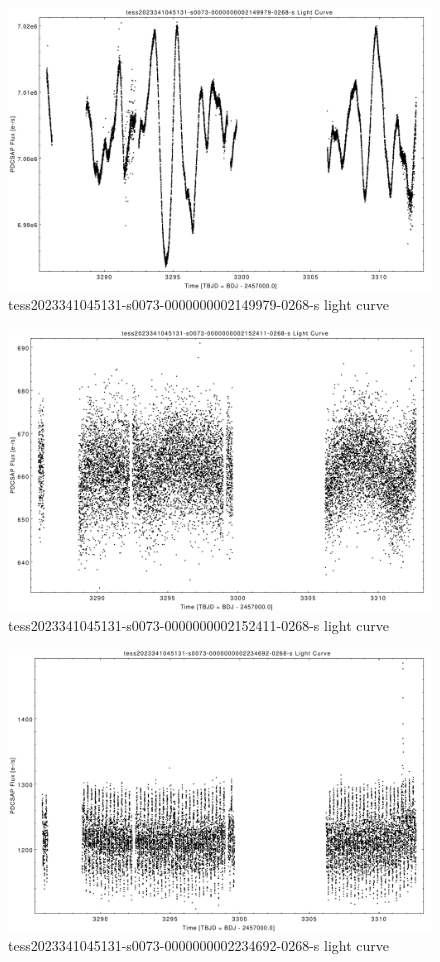 \documentclass[a4paper,12pt]{article}
\begin{document}
\begin{figure}[htbp]
    \centering
    \includegraphics[width = 1\textwidth]{
      ../lightcurves/tess2023341045131-s0073-0000000002149979-0268-s.pdf}
    \caption{tess2023341045131-s0073-0000000002149979-0268-s light curve}
\end{figure}
\begin{figure}[htbp]
    \centering
    \includegraphics[width = 1\textwidth]{
      ../lightcurves/tess2023341045131-s0073-0000000002152411-0268-s.pdf}
    \caption{tess2023341045131-s0073-0000000002152411-0268-s light curve}
\end{figure}
\begin{figure}[htbp]
    \centering
    \includegraphics[width = 1\textwidth]{
      ../lightcurves/tess2023341045131-s0073-0000000002234692-0268-s.pdf}
    \caption{tess2023341045131-s0073-0000000002234692-0268-s light curve}
\end{figure}
\end{document}

